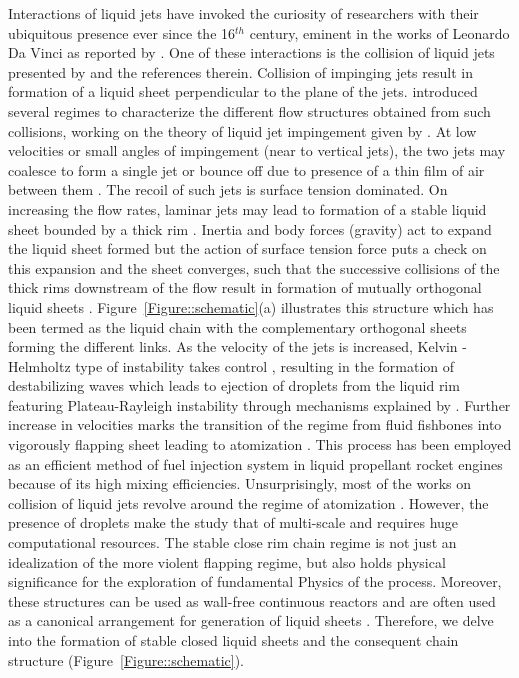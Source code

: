 \documentclass[%
aip,
sd,%
amsmath,amssymb,
preprint,%
author-year,%
]{revtex4-1}
\begin{document}
Interactions of liquid jets have invoked the curiosity of researchers with their ubiquitous presence \citep{eggers2008physics} ever since the 16$^{th}$ century, eminent in the works of Leonardo Da Vinci as reported by \cite{da1999codex}. One of these interactions is the collision of liquid jets presented by \cite{rayleigh1879capillary} and the references therein. Collision of impinging jets result in formation of a liquid sheet perpendicular to the plane of the jets. \cite{bush2004collision} introduced several regimes to characterize the different flow structures obtained from such collisions, working on the theory of liquid jet impingement given by \cite{taylor1960formation}. At low velocities or small angles of impingement (near to vertical jets), the two jets may coalesce to form a single jet or bounce off due to presence of a thin film of air between them \citep{wadhwa2013noncoalescence}. The recoil of such jets is surface tension dominated. On increasing the flow rates, laminar jets may lead to formation of a stable liquid sheet bounded by a thick rim \citep{yang2014liquid}. Inertia and body forces (gravity) act to expand the liquid sheet formed but the action of surface tension force puts a check on this expansion and the sheet converges, such that the successive collisions of the thick rims downstream of the flow result in formation of mutually orthogonal liquid sheets \citep{bush2004collision}. Figure~\ref{Figure::schematic}(a) illustrates this structure which has been termed as the liquid chain with the complementary orthogonal sheets forming the different links. As the velocity of the jets is increased, Kelvin - Helmholtz type of instability takes control \citep{bremond2006atomization}, resulting in the formation of destabilizing waves \citep{villermaux2002life} which leads to ejection of droplets from the liquid rim featuring Plateau-Rayleigh instability through mechanisms explained by \cite{lhuissier2011destabilization}. Further increase in velocities marks the transition of the regime from fluid fishbones into vigorously flapping sheet leading to atomization \citep{ibrahim1991impinging}. This process has been employed as an efficient method of fuel injection system in liquid propellant rocket engines because of its high mixing efficiencies. Unsurprisingly, most of the works on collision of liquid jets revolve around the regime of atomization \citep{miller1960distribution,ibrahim1991impinging,bremond2006atomization,chen2013high,zheng2015numerical}. However, the presence of droplets make the study that of multi-scale and requires huge computational resources. The stable close rim chain regime is not just an idealization of the more violent flapping regime, but also holds physical significance for the exploration of fundamental Physics of the process. Moreover, these structures can be used as wall-free continuous reactors \citep{erni2013free} and are often used as a canonical arrangement for generation of liquid sheets \citep{dombrowski1954photographic}. Therefore, we delve into the formation of stable closed liquid sheets and the consequent chain structure (Figure~\ref{Figure::schematic}). \\
\end{document}
